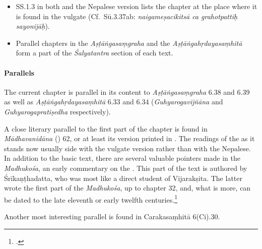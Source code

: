 \begin{itemize}
        \item SS.1.3 in both \cite{vulgate} and the Nepalese version lists the chapter at
        the place where it is found in the vulgate (Cf.\ Sū.3.37ab:
        \emph{naigameṣacikitsā ca grahotpattiḥ sayonijāḥ}). 
        
        \item Parallel chapters in the \emph{Aṣṭāṅgasaṃgraha} and the
        \emph{Aṣṭāṅgahṛdayasaṃhitā} form a part of the \emph{Śalyatantra} section of 
        each
        text.
    \end{itemize} 
    
    \paragraph{Parallels}
    
    The current chapter is parallel in its content to \emph{Aṣṭāṅgasaṃgraha} 6.38 
    and 6.39 as well as \emph{Aṣṭāṅgahṛdayasaṃhitā} 6.33 and 6.34 
    (\emph{Guhyarogavijñāna} and \emph{Guhyarogapratiṣedha} respectively).%
    
    A close literary parallel to the first part of the chapter is found in
    \emph{Mādhavanidāna} (\cite{madhava}) 62, or at least its version printed in
    \citet[361]{madhava}. The readings of the \cite{madhava} as it stands now usually
    side with the vulgate version rather than with the Nepalese. In addition to the
    basic text, there are several valuable pointers made in the \emph{Madhukośa}, an
    early commentary on the \cite{madhava}. This part of the text is authored by 
    Śrīkaṇṭhadatta,
    who was most like a direct student of Vijarakṣita. The latter wrote the first part
    of the \emph{Madhukośa}, up to chapter 32, and, what is more, can be dated to the
    late eleventh or early twelfth centuries.\footcite[22--26]{meul-1974}
    
    Another most interesting parallel is found in Carakasaṃhitā 6(Ci).30.
    
